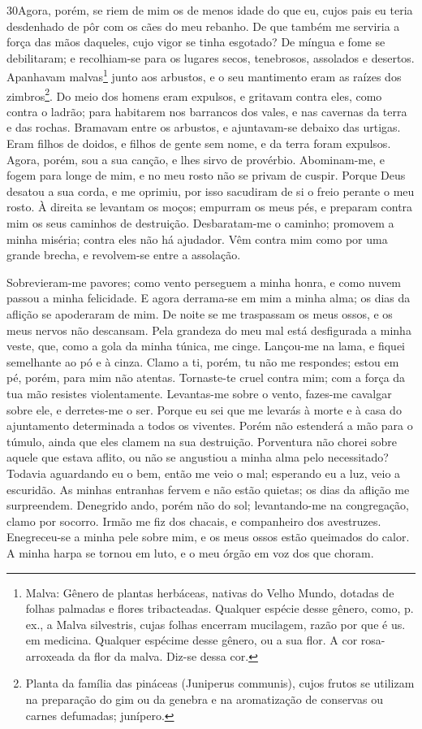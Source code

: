 \lettrine{30} Agora, porém, se riem de mim os de menos idade
do que eu, cujos pais eu teria desdenhado de pôr com os cães do meu
rebanho. De que também me serviria a força das mãos daqueles,
cujo vigor se tinha esgotado? De míngua e fome se debilitaram; e
recolhiam-se para os lugares secos, tenebrosos, assolados e
desertos. Apanhavam malvas\footnote{Malva: Gênero de plantas
herbáceas, nativas do Velho Mundo, dotadas de folhas palmadas e
flores tribacteadas. Qualquer espécie desse gênero, como, p. ex., a
Malva silvestris, cujas folhas encerram mucilagem, razão por que é
us. em medicina. Qualquer espécime desse gênero, ou a sua flor. A
cor rosa-arroxeada da flor da malva. Diz-se dessa cor.} junto aos
arbustos, e o seu mantimento eram as raízes dos
zimbros\footnote{Planta da família das pináceas (Juniperus
communis), cujos frutos se utilizam na preparação do gim ou da
genebra e na aromatização de conservas ou carnes defumadas;
junípero.}. Do meio dos homens eram expulsos, e gritavam contra
eles, como contra o ladrão; para habitarem nos barrancos dos
vales, e nas cavernas da terra e das rochas. Bramavam entre os
arbustos, e ajuntavam-se debaixo das urtigas. Eram filhos de
doidos, e filhos de gente sem nome, e da terra foram expulsos.
Agora, porém, sou a sua canção, e lhes sirvo de provérbio.
Abominam-me, e fogem para longe de mim, e no meu rosto não se
privam de cuspir. Porque Deus desatou a sua corda, e me
oprimiu, por isso sacudiram de si o freio perante o meu rosto.
À direita se levantam os moços; empurram os meus pés, e
preparam contra mim os seus caminhos de destruição.
Desbaratam-me o caminho; promovem a minha miséria; contra
eles não há ajudador. Vêm contra mim como por uma grande
brecha, e revolvem-se entre a assolação.

Sobrevieram-me pavores; como vento perseguem a minha honra, e
como nuvem passou a minha felicidade. E agora derrama-se em
mim a minha alma; os dias da aflição se apoderaram de mim. De
noite se me traspassam os meus ossos, e os meus nervos não
descansam. Pela grandeza do meu mal está desfigurada a minha
veste, que, como a gola da minha túnica, me cinge. Lançou-me
na lama, e fiquei semelhante ao pó e à cinza. Clamo a ti,
porém, tu não me respondes; estou em pé, porém, para mim não
atentas. Tornaste-te cruel contra mim; com a força da tua mão
resistes violentamente. Levantas-me sobre o vento, fazes-me
cavalgar sobre ele, e derretes-me o ser. Porque eu sei que me
levarás à morte e à casa do ajuntamento determinada a todos os
viventes. Porém não estenderá a mão para o túmulo, ainda que
eles clamem na sua destruição. Porventura não chorei sobre
aquele que estava aflito, ou não se angustiou a minha alma pelo
necessitado? Todavia aguardando eu o bem, então me veio o
mal; esperando eu a luz, veio a escuridão. As minhas
entranhas fervem e não estão quietas; os dias da aflição me
surpreendem. Denegrido ando, porém não do sol; levantando-me
na congregação, clamo por socorro. Irmão me fiz dos chacais,
e companheiro dos avestruzes. Enegreceu-se a minha pele sobre
mim, e os meus ossos estão queimados do calor. A minha harpa
se tornou em luto, e o meu órgão em voz dos que choram.

